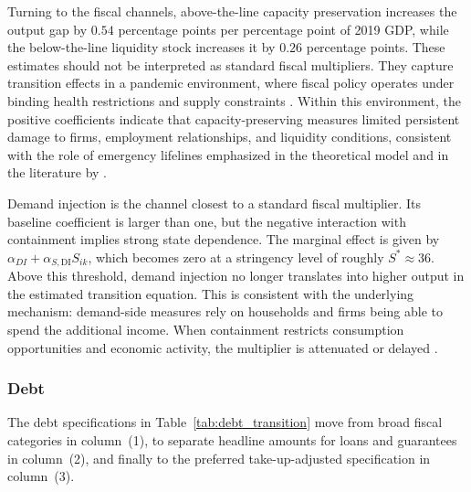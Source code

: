 \documentclass[12pt, a4paper]{article}
\begin{document}
Turning to the fiscal channels, above-the-line capacity preservation increases the output gap by $0.54$ percentage points per percentage point of 2019 GDP, while the below-the-line liquidity stock increases it by $0.26$ percentage points. These estimates should not be interpreted as standard fiscal multipliers. They
capture transition effects in a pandemic environment, where fiscal policy operates under binding health restrictions and supply constraints \citep{guerrieri2022, chetty2020}. Within this environment, the positive
coefficients indicate that capacity-preserving measures limited persistent damage to firms, employment relationships, and liquidity conditions, consistent with the role of emergency lifelines emphasized in the theoretical model and in the literature by \citet{deb2021, fariaecastro2020f}.

Demand injection is the channel closest to a standard fiscal multiplier. Its baseline coefficient is larger than one, but the negative interaction with containment implies strong state dependence. The marginal effect is given by $\alpha_{DI}+\alpha_{S,\text{DI}}S_{ik}$, which becomes zero at a stringency level of roughly $S^{*}\approx 36$. Above this threshold, demand injection no longer translates into higher output in the estimated transition equation. This is consistent with the underlying mechanism: demand-side measures rely on households and firms being able to spend the additional income. When containment restricts consumption opportunities and economic activity, the multiplier is attenuated or delayed \citep{chetty2020, guerrieri2022, coibion2020}. 

\subsubsection{Debt}
\label{subsub:results_debt}
The debt specifications in Table~\ref{tab:debt_transition} move from broad fiscal categories in column~(1), to separate headline amounts for loans and guarantees in column~(2), and finally to the preferred take-up-adjusted specification in column~(3).
\end{document}
